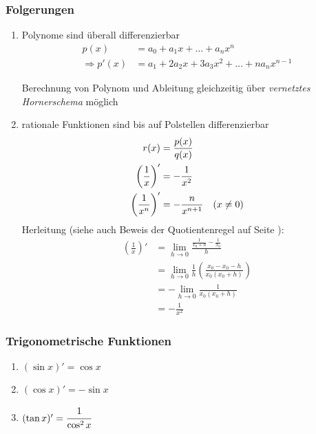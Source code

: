 \newpage
{}

\subsubsection*{Folgerungen}

\begin{enumerate}
	\item Polynome sind überall differenzierbar \\
	\begin{align*}
		p(x) &= a_0 + a_1 x + \dots + a_n x^n \\
		\Rightarrow p'(x) &= a_1 + 2 a_2 x + 3 a_3 x^2 + \dots + n a_n x^{n-1}
	\end{align*}
	\begin{note}Berechnung von Polynom und Ableitung gleichzeitig über \emph{vernetztes Hornerschema} möglich\end{note}
	\item rationale Funktionen sind bis auf Polstellen differenzierbar
	\begin{align*}
		r(x) &= \frac{p(x)}{q(x)} \\
		\left( \frac{1}{x} \right)' &= -\frac{1}{x^2} \\
		\left( \frac{1}{x^n} \right)' &= -\frac{n}{x^{n+1}} \hspace{10px} (x \neq 0)
	\end{align*}
	Herleitung (siehe auch Beweis der Quotientenregel auf Seite \pageref{proof:quotregel}):
	\begin{align*}
		\left( \frac{1}{x} \right)' &= \lim\limits_{h \rightarrow 0} \frac{\frac{1}{x_0+h} - \frac{1}{x_0}}{h} \\
		&= \lim\limits_{h \rightarrow 0} \frac{1}{h} \left( \frac{x_0 - x_0 - h}{x_0 (x_0+h)} \right) \\
		&= - \lim\limits_{h \rightarrow 0} \frac{1}{x_0 (x_0 + h)} \\
		&= -\frac{1}{x^2}
	\end{align*}
\end{enumerate}

\subsubsection*{Trigonometrische Funktionen}
\begin{enumerate}
	\item $ (\sin x)' = \cos x $
	\item $ (\cos x)' = - \sin x $
	\item $ (\tan x)' = \cfrac{1}{\cos^2 x} $
\end{enumerate}

